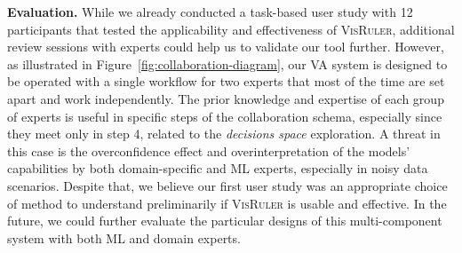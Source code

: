 \textbf{Evaluation.} While we already conducted a task-based user study with 12 participants that tested the applicability and effectiveness of \textsc{VisRuler}, additional review sessions with experts could help us to validate our tool further. However, as illustrated in Figure~\ref{fig:collaboration-diagram}, our VA system is designed to be operated with a single workflow for two experts that most of the time are set apart and work independently. The prior knowledge and expertise of each group of experts is useful in specific steps of the collaboration schema, especially since they meet only in step 4, related to the \emph{decisions space} exploration. A threat in this case is the overconfidence effect and overinterpretation of the models' capabilities by both domain-specific and ML experts, especially in noisy data scenarios. Despite that, we believe our first user study was an appropriate choice of method to understand preliminarily if \textsc{VisRuler} is usable and effective. In the future, we could further evaluate the particular designs of this multi-component system with both ML and domain experts.